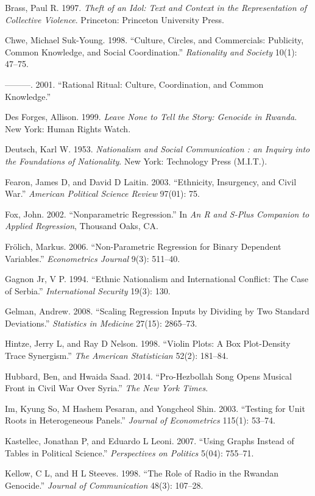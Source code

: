 \documentclass[11pt,article,oneside]{memoir}
\begin{document}
Brass, Paul R. 1997. \emph{Theft of an Idol: Text and Context in the
Representation of Collective Violence}. Princeton: Princeton University
Press.

Chwe, Michael Suk-Young. 1998. ``Culture, Circles, and Commercials:
Publicity, Common Knowledge, and Social Coordination.''
\emph{Rationality and Society} 10(1): 47--75.

---------. 2001. ``Rational Ritual: Culture, Coordination, and Common
Knowledge.''

Des Forges, Allison. 1999. \emph{Leave None to Tell the Story: Genocide
in Rwanda}. New York: Human Rights Watch.

Deutsch, Karl W. 1953. \emph{Nationalism and Social Communication : an
Inquiry into the Foundations of Nationality}. New York: Technology Press
(M.I.T.).

Fearon, James D, and David D Laitin. 2003. ``Ethnicity, Insurgency, and
Civil War.'' \emph{American Political Science Review} 97(01): 75.

Fox, John. 2002. ``Nonparametric Regression.'' In \emph{An R and S-Plus
Companion to Applied Regression}, Thousand Oaks, CA.

Fr{ö}lich, Markus. 2006. ``Non-Parametric Regression for Binary
Dependent Variables.'' \emph{Econometrics Journal} 9(3): 511--40.

Gagnon Jr, V P. 1994. ``Ethnic Nationalism and International Conflict:
The Case of Serbia.'' \emph{International Security} 19(3): 130.

Gelman, Andrew. 2008. ``Scaling Regression Inputs by Dividing by Two
Standard Deviations.'' \emph{Statistics in Medicine} 27(15): 2865--73.

Hintze, Jerry L, and Ray D Nelson. 1998. ``Violin Plots: A Box
Plot-Density Trace Synergism.'' \emph{The American Statistician} 52(2):
181--84.

Hubbard, Ben, and Hwaida Saad. 2014. ``Pro-Hezbollah Song Opens Musical
Front in Civil War Over Syria.'' \emph{The New York Times}.

Im, Kyung So, M Hashem Pesaran, and Yongcheol Shin. 2003. ``Testing for
Unit Roots in Heterogeneous Panels.'' \emph{Journal of Econometrics}
115(1): 53--74.

Kastellec, Jonathan P, and Eduardo L Leoni. 2007. ``Using Graphs Instead
of Tables in Political Science.'' \emph{Perspectives on Politics} 5(04):
755--71.

Kellow, C L, and H L Steeves. 1998. ``The Role of Radio in the Rwandan
Genocide.'' \emph{Journal of Communication} 48(3): 107--28.
\end{document}
